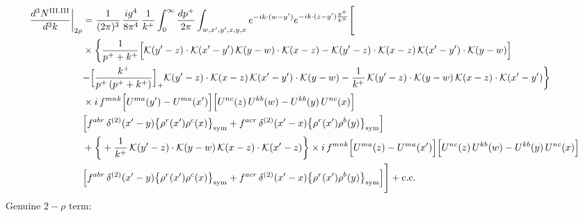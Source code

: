 \documentclass[9pt]{article}
\numberwithin{equation}{section}
\begin{document}
\begin{align}
\frac{d^{3}N^{\rm III.III}}{d^{3}k}\bigg|_{2\rho}&=\frac{1}{(2\pi)^{3}}\,\frac{ig^{4}}{8\pi^{4}}\,\frac{1}{k^{+}}\int_{0}^{\infty}\frac{dp^{+}}{2\pi}\int_{w,x',y',z,y,x}e^{-ik\cdot{(w-y')}}e^{-ik\cdot{(z-y')}\frac{p^{+}}{k^{+}}}\Bigg[\notag\\
&\times\bigg\{\frac{1}{p^{+}+k^{+}}\Big[\mathcal{K}(y'-z)\cdot\mathcal{K}(x'-y')\,\mathcal{K}(y-w)\cdot\mathcal{K}(x-z)-\mathcal{K}(y'-z)\cdot\mathcal{K}(x-z)\,\mathcal{K}(x'-y')\cdot\mathcal{K}(y-w)\Big]\notag\\
&{-\Big[\frac{k^{+}}{p^{+}\,(p^{+}+k^{+})}\Big]_{+}\mathcal{K}(y'-z)\cdot\mathcal{K}(x-z)\,\mathcal{K}(x'-y')\cdot\mathcal{K}(y-w)}-\frac{1}{k^{+}}\,\mathcal{K}(y'-z)\cdot\mathcal{K}(y-w)\,\mathcal{K}(x-z)\cdot\mathcal{K}(x'-y')\bigg\}\notag\\
&\times i\,f^{mnk}\Big[U^{ma}(y')-U^{ma}(x')\Big]\Big[U^{nc}(z)\,U^{kb}(w)-U^{kb}(y)\,U^{nc}(x)\Big]\notag \\ & \Big[f^{abr}\,\delta^{(2)}(x'-y)\big\{\rho^{r}(x')\rho^{c}(x)\big\}_{\rm sym} +f^{acr}\,\delta^{(2)}(x'-x)\big\{\rho^{r}(x')\rho^{b}(y)\big\}_{\rm sym}\Big]\notag\\
&+\bigg\{+\frac{1}{k^{+}}\,\mathcal{K}(y'-z)\cdot\mathcal{K}(y-w)\,\mathcal{K}(x-z)\cdot\mathcal{K}(x'-z)\bigg\}\times i\,f^{mnk}\Big[U^{ma}(z)-U^{ma}(x')\Big]\Big[U^{nc}(z)\,U^{kb}(w)-U^{kb}(y)\,U^{nc}(x)\Big]\notag \\ & \Big[f^{abr}\,\delta^{(2)}(x'-y)\big\{\rho^{r}(x')\rho^{c}(x)\big\}_{\rm sym} +f^{acr}\,\delta^{(2)}(x'-x)\big\{\rho^{r}(x')\rho^{b}(y)\big\}_{\rm sym}\Big]\Bigg]+{\rm c.c.}\label{eq:D-III.III-2}
\end{align}
Genuine $2-\rho$ term:
\end{document}
